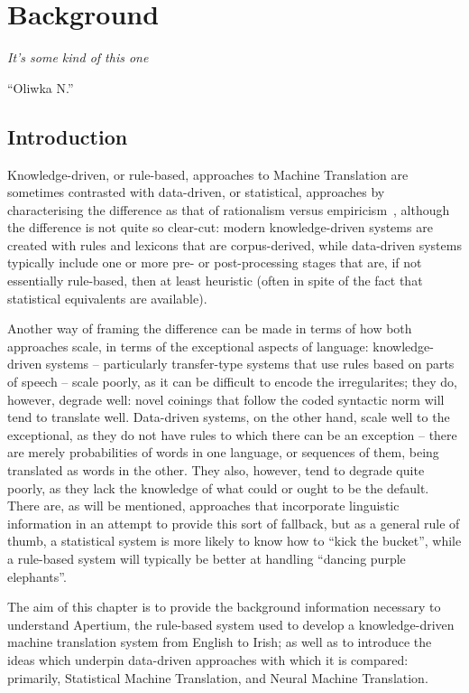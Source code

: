 
\chapter{Background}
\label{chap:litreview}
\epigraph{\textit{\small{It's some kind of this one}}}{``Oliwka N.''}

\section{Introduction}

Knowledge-driven, or rule-based, approaches to Machine Translation are sometimes
contrasted with data-driven, or statistical, approaches by characterising the difference
as that of rationalism versus empiricism~\citep[e.g., ][p. 4]{Somers2003}, although
the difference is not quite so clear-cut: modern knowledge-driven systems are created
with rules and lexicons that are corpus-derived, while data-driven systems typically
include one or more pre- or post-processing stages that are, if not essentially rule-based,
then at least heuristic (often in spite of the fact that statistical equivalents are
available).

Another way of framing the difference can be made in terms of how both approaches scale,
in terms of the exceptional aspects of language: knowledge-driven systems -- particularly
transfer-type systems that use rules based on parts of speech -- scale poorly, as it can be
difficult to encode the irregularites; they do, however, degrade well: novel coinings that follow the
coded syntactic norm will tend to translate well. Data-driven systems, on the other hand,
scale well to the exceptional, as they do not have rules to which there can be an
exception -- there are merely probabilities of words in one language, or sequences of them, being translated
as words in the other. They also, however, tend to degrade quite poorly, as they lack
the knowledge of what could or ought to be the default. There are, as will be mentioned, approaches
that incorporate linguistic information in an attempt to provide this sort of fallback, but
as a general rule of thumb, a statistical system is more likely to know how to ``kick the bucket'',
while a rule-based system will typically be better at handling ``dancing purple elephants''.

The aim of this chapter is to provide the background information necessary to understand
Apertium, the rule-based system used to develop a knowledge-driven machine translation system
from English to Irish; as well as to introduce the ideas which underpin data-driven 
approaches with which it is compared: primarily, Statistical Machine Translation, and Neural
Machine Translation.

